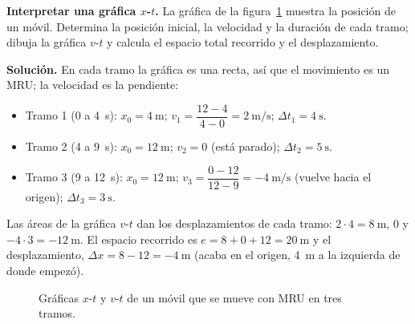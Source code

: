 \begin{example}
    \textbf{Interpretar una gráfica \(x\)-\(t\).} La gráfica de la figura~\ref{fig:ud9-tramos} muestra la posición de un móvil.
    Determina la posición inicial, la velocidad y la duración de cada tramo; dibuja la gráfica \(v\)-\(t\) y calcula el espacio total
    recorrido y el desplazamiento.

    \textbf{Solución.} En cada tramo la gráfica es una recta, así que el movimiento es un MRU; la velocidad es la pendiente:
    \begin{itemize}
        \item Tramo 1 (0 a \qty{4}{\s}): \(x_0 = \qty{4}{\m}\); \(v_1 = \dfrac{12 - 4}{4 - 0} = \qty{2}{\m\per\s}\); \(\Delta t_1 = \qty{4}{\s}\).
        \item Tramo 2 (4 a \qty{9}{\s}): \(x_0 = \qty{12}{\m}\); \(v_2 = 0\) (está parado); \(\Delta t_2 = \qty{5}{\s}\).
        \item Tramo 3 (9 a \qty{12}{\s}): \(x_0 = \qty{12}{\m}\); \(v_3 = \dfrac{0 - 12}{12 - 9} = \qty{-4}{\m\per\s}\) (vuelve hacia el
        origen); \(\Delta t_3 = \qty{3}{\s}\).
    \end{itemize}
    Las áreas de la gráfica \(v\)-\(t\) dan los desplazamientos de cada tramo: \(2 \cdot 4 = \qty{8}{\m}\), 0 y \(-4 \cdot 3 =
    \qty{-12}{\m}\). El espacio recorrido es \(e = 8 + 0 + 12 = \qty{20}{\m}\) y el desplazamiento, \(\Delta x = 8 - 12 = \qty{-4}{\m}\)
    (acaba en el origen, \qty{4}{\m} a la izquierda de donde empezó).
\end{example}

\begin{figure}[H]
    \centering
    \hspace{1cm}
    \caption{Gráficas \(x\)-\(t\) y \(v\)-\(t\) de un móvil que se mueve con MRU en tres tramos.}
    \label{fig:ud9-tramos}
\end{figure}

